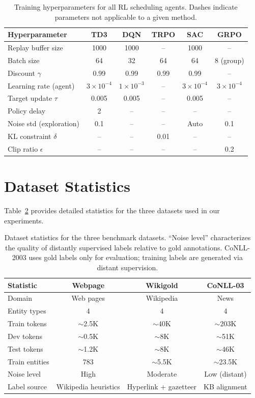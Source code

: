 \documentclass[11pt]{article}
\begin{document}
\begin{table}[h!]
\centering
\small
\begin{tabular}{@{}lccccc@{}}
\toprule
\textbf{Hyperparameter} & \textbf{TD3} & \textbf{DQN} & \textbf{TRPO} & \textbf{SAC} & \textbf{GRPO} \\
\midrule
Replay buffer size & 1000 & 1000 & -- & 1000 & -- \\
Batch size & 64 & 32 & 64 & 64 & 8 (group) \\
Discount $\gamma$ & 0.99 & 0.99 & 0.99 & 0.99 & -- \\
Learning rate (agent) & $3 \times 10^{-4}$ & $1 \times 10^{-3}$ & -- & $3 \times 10^{-4}$ & $3 \times 10^{-4}$ \\
Target update $\tau$ & 0.005 & 0.005 & -- & 0.005 & -- \\
Policy delay & 2 & -- & -- & -- & -- \\
Noise std (exploration) & 0.1 & -- & -- & Auto & 0.1 \\
KL constraint $\delta$ & -- & -- & 0.01 & -- & -- \\
Clip ratio $\epsilon$ & -- & -- & -- & -- & 0.2 \\
\bottomrule
\end{tabular}
\caption{Training hyperparameters for all RL scheduling agents. Dashes indicate parameters not applicable to a given method.}
\label{tab:rl-hyperparams}
\end{table}

\section{Dataset Statistics}
\label{sec:dataset-stats}

Table~\ref{tab:dataset-stats} provides detailed statistics for the three datasets used in our experiments.

\begin{table}[h!]
\centering
\small
\begin{tabular}{@{}lccc@{}}
\toprule
\textbf{Statistic} & \textbf{Webpage} & \textbf{Wikigold} & \textbf{CoNLL-03} \\
\midrule
Domain & Web pages & Wikipedia & News \\
Entity types & 4 & 4 & 4 \\
Train tokens & $\sim$2.5K & $\sim$40K & $\sim$203K \\
Dev tokens & $\sim$0.5K & $\sim$8K & $\sim$51K \\
Test tokens & $\sim$1.2K & $\sim$8K & $\sim$46K \\
Train entities & 783 & $\sim$5.5K & $\sim$23.5K \\
Noise level & High & Moderate & Low (distant) \\
Label source & Wikipedia heuristics & Hyperlink + gazetteer & KB alignment \\
\bottomrule
\end{tabular}
\caption{Dataset statistics for the three benchmark datasets. ``Noise level'' characterizes the quality of distantly supervised labels relative to gold annotations. CoNLL-2003 uses gold labels only for evaluation; training labels are generated via distant supervision.}
\label{tab:dataset-stats}
\end{table}
\end{document}

